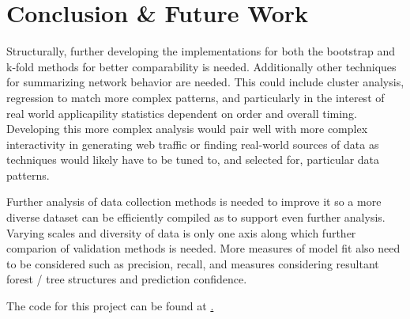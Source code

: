 \documentclass[10pt,sigconf,letterpaper,nonacm]{acmart}
\begin{document}
\section{Conclusion \& Future Work}
\par Structurally, further developing the implementations for both the bootstrap and
k-fold methods for better comparability is needed. Additionally other techniques for
summarizing network behavior are needed. This could include cluster analysis, regression
to match more complex patterns, and particularly in the interest of real world
applicapility statistics dependent on order and overall timing. Developing this more
complex analysis would pair well with more complex interactivity in generating web
traffic or finding real-world sources of data as techniques would likely have to be tuned
to, and selected for, particular data patterns.
\par Further analysis of data collection methods is needed to improve it so a more
diverse dataset can be efficiently compiled as to support even further analysis. Varying
scales and diversity of data is only one axis along which further comparion of validation
methods is needed. More measures of model fit also need to be considered such as
precision, recall, and measures considering resultant forest / tree structures and
prediction confidence.
\par The code for this project can be found at
\href{https://github.com/rrjooss/CSCI434-CapstoneProject}.





\end{document}
